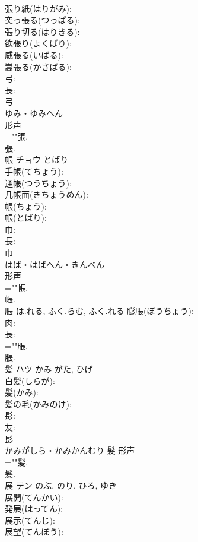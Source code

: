 \documentclass[8pt]{extreport}
\begin{document}
\begin{CJK}{UTF8}{min}
\\	張り紙(はりがみ): 
\\	突っ張る(つっぱる): 
\\	張り切る(はりきる): 
\\	欲張り(よくばり): 
\\	威張る(いばる): 
\\	嵩張る(かさばる): 
\\	弓: 
\\	長: 
\\	弓	
\\	ゆみ・ゆみへん	
\\	形声 
\\	=""張.
\\	張.
\\	帳	チョウ	とばり		
\\	手帳(てちょう): 
\\	通帳(つうちょう): 
\\	几帳面(きちょうめん): 
\\	帳(ちょう): 
\\	帳(とばり): 
\\	巾: 
\\	長: 
\\	巾	
\\	はば・はばへん・きんべん	
\\	形声 
\\	=""帳.
\\	帳.
\\	脹		は.れる, ふく.らむ, ふく.れる			膨脹(ぼうちょう): 
\\	肉: 
\\	長: 
\\	=""脹.
\\	脹.
\\	髪	ハツ	かみ	がた, ひげ	
\\	白髪(しらが): 
\\	髪(かみ): 
\\	髪の毛(かみのけ): 
\\	髟: 
\\	友: 
\\	髟	
\\	かみがしら・かみかんむり	髮	形声 
\\	=""髪.
\\	髪.
\\	展	テン		のぶ, のり, ひろ, ゆき	
\\	展開(てんかい): 
\\	発展(はってん): 
\\	展示(てんじ): 
\\	展望(てんぼう): 

\end{CJK}
\end{document}
